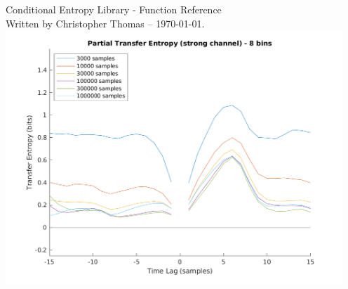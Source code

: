 \documentclass[letterpaper,11pt]{report}
\begin{document}
%
%
\pagestyle{empty}

\begin{center}
%
\vspace*{1in}
{\Huge Conditional Entropy Library - Function Reference} \\
{\footnotesize Written by Christopher Thomas -- \today.}
%
\vspace*{1in}\\
\includegraphics[width=5in]{plots/pte-strong-laglength-08bins.png}
%
\end{center}
%
\vfill
{\tiny }
%
\clearpage
%
%
%
%
\pagestyle{plain}
\setcounter{page}{1}
%
%
%
\tableofcontents
\clearpage
%
%
%
\pagestyle{plain}
\setcounter{page}{1}
%



%
%
\end{document}
